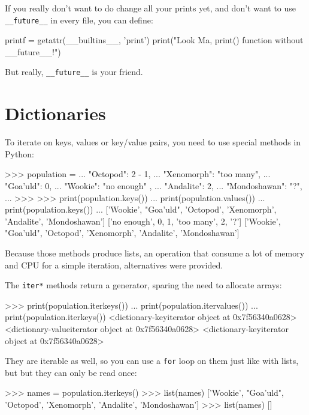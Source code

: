If you really don't want to do change all your prints yet, and don't want to use \lstinline{__future__} in every file, you can define:

\begin{py}
printf = getattr(__builtins__, 'print')
print("Look Ma, print() function without __future__!")
\end{py}

But really, \lstinline{__future__} is your friend.

\section{Dictionaries}

To iterate on keys, values or key/value pairs, you need to use special methods in Python:

\begin{py}
>>> population = {
...     "Octopod": 2 - 1,
...     "Xenomorph": "too many",
...     "Goa'uld": 0,
...     "Wookie": "no enough" ,
...     "Andalite": 2,
...     "Mondoshawan": "?",
... }
>>>
>>> print(population.keys())
... print(population.values())
... print(population.keys())
...
['Wookie', "Goa'uld", 'Octopod', 'Xenomorph', 'Andalite', 'Mondoshawan']
['no enough', 0, 1, 'too many', 2, '?']
['Wookie', "Goa'uld", 'Octopod', 'Xenomorph', 'Andalite', 'Mondoshawan']
\end{py}

Because those methods produce lists, an operation that consume a lot of memory and CPU for a simple iteration, alternatives were provided.

The \lstinline{iter*} methods return a generator, sparing the need to allocate arrays:

\begin{py}
>>> print(population.iterkeys())
... print(population.itervalues())
... print(population.iterkeys())
<dictionary-keyiterator object at 0x7f56340a0628>
<dictionary-valueiterator object at 0x7f56340a0628>
<dictionary-keyiterator object at 0x7f56340a0628>
\end{py}

They are \gls{iterable} as well, so you can use a \lstinline{for} loop on them just like with lists, but but they can only be read once:

\begin{py}
>>> names = population.iterkeys()
>>> list(names)
['Wookie', "Goa'uld", 'Octopod', 'Xenomorph', 'Andalite', 'Mondoshawan']
>>> list(names)
[]
\end{py}

